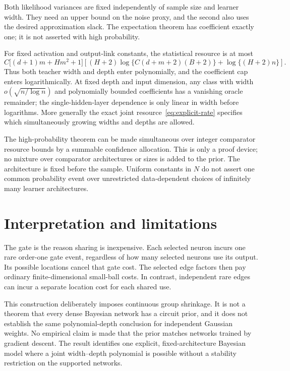 \documentclass[11pt]{article}
\theoremstyle{remark}\newtheorem{remark}[theorem]{Remark}
\begin{document}
Both likelihood variances are fixed independently of sample size and learner width. They need an upper bound on the noise proxy, and the second also uses the desired approximation slack. The expectation theorem has coefficient exactly one; it is not asserted with high probability.

For fixed activation and output-link constants, the statistical resource is at most
\begin{equation}
 C\big[(d+1)m+Hm^2+1\big]
 \left[(H+2)\log\{C(d+m+2)(B+2)\}+\log\{(H+2)n\}\right].
 \label{eq:explicit-rate}
\end{equation}
Thus both teacher width and depth enter polynomially, and the coefficient cap enters logarithmically. At fixed depth and input dimension, any class with width $o(\sqrt{n/\log n})$ and polynomially bounded coefficients has a vanishing oracle remainder; the single-hidden-layer dependence is only linear in width before logarithms. More generally the exact joint resource~\eqref{eq:explicit-rate} specifies which simultaneously growing widths and depths are allowed.

The high-probability theorem can be made simultaneous over integer comparator resource bounds by a summable confidence allocation. This is only a proof device; no mixture over comparator architectures or sizes is added to the prior. The architecture is fixed before the sample. Uniform constants in $N$ do not assert one common probability event over unrestricted data-dependent choices of infinitely many learner architectures.













\section{Interpretation and limitations}
The gate is the reason sharing is inexpensive. Each selected neuron incurs one rare order-one gate event, regardless of how many selected neurons use its output. Its possible locations cancel that gate cost. The selected edge factors then pay ordinary finite-dimensional small-ball costs. In contrast, independent rare edges can incur a separate location cost for each shared use.

This construction deliberately imposes continuous group shrinkage. It is not a theorem that every dense Bayesian network has a circuit prior, and it does not establish the same polynomial-depth conclusion for independent Gaussian weights. No empirical claim is made that the prior matches networks trained by gradient descent. The result identifies one explicit, fixed-architecture Bayesian model where a joint width--depth polynomial is possible without a stability restriction on the supported networks.
\end{document}
